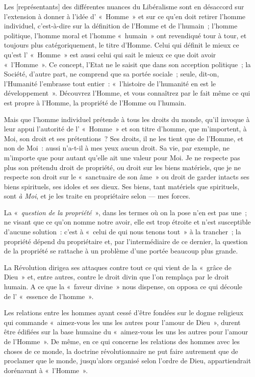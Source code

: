 \documentclass[french,twoside]{book} %
\newcommand\corr[1]{#1}
\begin{document}
Les [{\corr représentants}] des différentes nuances du Libéralisme sont en désaccord sur l’extension à donner à l’idée d’ « Homme » et sur ce qu’en doit retirer l’homme individuel, c’est-à-dire sur la définition de l’Homme et de l’humain ; l’homme politique, l’homme moral et l’homme « humain » ont revendiqué tour à tour, et toujours plus catégoriquement, le titre d’Homme. Celui qui définit le mieux ce qu’est l’ « Homme » est aussi celui qui sait le mieux ce que doit avoir « l’Homme ». Ce concept, l’Etat ne le saisit que dans son acception politique ; la Société, d’autre part, ne comprend que sa portée sociale ; seule, dit-on, l’Humanité l’embrasse tout entier : « l’histoire de l’humanité en est le développement ». Découvrez l’Homme, et vous connaîtrez par le fait même ce qui est propre à l’Homme, la propriété de l’Homme ou l’humain.\par
Mais que l’homme individuel prétende à tous les droits du monde, qu’il invoque à leur appui l’autorité de l’ « Homme » et son titre d’homme, que m’importent, à Moi, son droit et ses prétentions ? Ses droits, il ne les tient que de l’Homme, et non de Moi : aussi n’a-t-il à mes yeux aucun droit. Sa vie, par exemple, ne m’importe que pour autant qu’elle ait une valeur pour Moi. Je ne respecte pas plus son prétendu droit de propriété, ou droit sur les biens matériels, que je ne respecte son droit sur le « sanctuaire de son âme » ou droit de garder intacts ses biens spirituels, ses idoles et ses dieux. Ses biens, tant matériels que spirituels, sont \emph{à Moi}, et je les traite en propriétaire selon — mes forces.\par
La « \emph{question de la propriété} », dans les termes où on la pose n’en est pas une ; ne visant que ce qu’on nomme notre avoir, elle est trop étroite et n’est susceptible d’aucune solution : c’est à « celui de qui nous  tenons tout » à la trancher ; la propriété dépend du propriétaire et, par l’intermédiaire de ce dernier, la question de la propriété se rattache à un problème d’une portée beaucoup plus grande.\par
La Révolution dirigea ses attaques contre tout ce qui vient de la « grâce de Dieu » et, entre autres, contre le droit divin que l’on remplaça par le droit humain. A ce que la « faveur divine » nous dispense, on opposa ce qui découle de l’ « essence de l’homme ».\par
Les relations entre les hommes ayant cessé d’être fondées sur le dogme religieux qui commande « aimez-vous les uns les autres pour l’amour de Dieu », durent être édifiées sur la base humaine du « aimez-vous les uns les autres pour l’amour de l’Homme ». De même, en ce qui concerne les relations des hommes avec les choses de ce monde, la doctrine révolutionnaire ne put faire autrement que de proclamer que le monde, jusqu’alors organisé selon l’ordre de Dieu, appartiendrait dorénavant à « l’Homme ».\par
\end{document}
